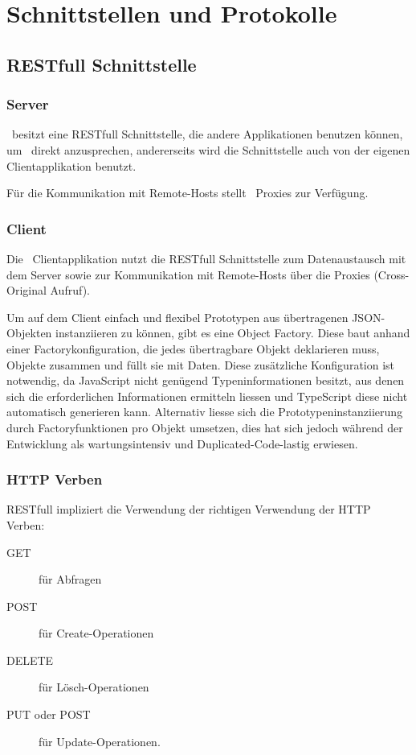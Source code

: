 \chapter{Schnittstellen und Protokolle}
	
\section{RESTfull Schnittstelle}

	\subsection{Server}
		\eeppi\ besitzt eine RESTfull Schnittstelle, die andere Applikationen benutzen können, um \eeppi\ direkt anzusprechen, andererseits wird die Schnittstelle auch von der eigenen Clientapplikation benutzt.
		
		Für die Kommunikation mit Remote-Hosts stellt \eeppi\ Proxies zur Verfügung.
	
	
	\subsection{Client}
		Die \eeppi\ Clientapplikation nutzt die RESTfull Schnittstelle zum Datenaustausch mit dem Server sowie zur Kommunikation mit Remote-Hosts über die Proxies (Cross-Original Aufruf).
		
		Um auf dem Client einfach und flexibel Prototypen aus übertragenen JSON-Objekten instanziieren zu können, gibt es eine Object Factory.
		Diese baut anhand einer Factorykonfiguration, die jedes übertragbare Objekt deklarieren muss, Objekte zusammen und füllt sie mit Daten.
		Diese zusätzliche Konfiguration ist notwendig, da JavaScript nicht genügend Typeninformationen besitzt, aus denen sich die erforderlichen Informationen ermitteln liessen und TypeScript diese nicht automatisch generieren kann.
		Alternativ liesse sich die Prototypeninstanziierung  durch Factoryfunktionen pro Objekt umsetzen, dies hat sich jedoch während der Entwicklung als wartungsintensiv und Duplicated-Code-lastig erwiesen.
		
	\subsection{HTTP Verben}
		RESTfull impliziert die Verwendung der richtigen Verwendung der HTTP Verben: 
		\begin{description}
			\item[GET] für Abfragen
			\item[POST] für Create-Operationen
			\item[DELETE] für Lösch-Operationen
			\item[PUT oder POST] für Update-Operationen.
		\end{description}
		
